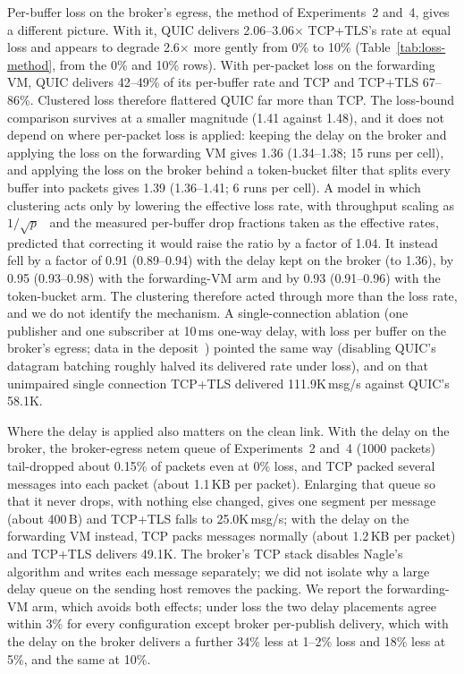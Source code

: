 \documentclass[a4paper,fleqn]{cas-dc}
\begin{document}
Per-buffer loss on the broker's egress, the method of Experiments~2 and~4, gives a different picture. With it, QUIC delivers 2.06--3.06$\times$ TCP+TLS's rate at equal loss and appears to degrade 2.6$\times$ more gently from 0\% to 10\% (Table~\ref{tab:loss-method}, from the 0\% and 10\% rows). With per-packet loss on the forwarding VM, QUIC delivers 42--49\% of its per-buffer rate and TCP and TCP+TLS 67--86\%. Clustered loss therefore flattered QUIC far more than TCP. The loss-bound comparison survives at a smaller magnitude (1.41 against 1.48), and it does not depend on where per-packet loss is applied: keeping the delay on the broker and applying the loss on the forwarding VM gives 1.36 (1.34--1.38; 15 runs per cell), and applying the loss on the broker behind a token-bucket filter that splits every buffer into packets gives 1.39 (1.36--1.41; 6 runs per cell). A model in which clustering acts only by lowering the effective loss rate, with throughput scaling as $1/\sqrt{p}$~\cite{mathis1997macroscopic} and the measured per-buffer drop fractions taken as the effective rates, predicted that correcting it would raise the ratio by a factor of 1.04. It instead fell by a factor of 0.91 (0.89--0.94) with the delay kept on the broker (to 1.36), by 0.95 (0.93--0.98) with the forwarding-VM arm and by 0.93 (0.91--0.96) with the token-bucket arm. The clustering therefore acted through more than the loss rate, and we do not identify the mechanism. A single-connection ablation (one publisher and one subscriber at 10\,ms one-way delay, with loss per buffer on the broker's egress; data in the deposit~\cite{bracht2026zenodo}) pointed the same way (disabling QUIC's datagram batching roughly halved its delivered rate under loss), and on that unimpaired single connection TCP+TLS delivered 111.9K\,msg/s against QUIC's 58.1K.

Where the delay is applied also matters on the clean link. With the delay on the broker, the broker-egress netem queue of Experiments~2 and~4 (1000 packets) tail-dropped about 0.15\% of packets even at 0\% loss, and TCP packed several messages into each packet (about 1.1\,KB per packet). Enlarging that queue so that it never drops, with nothing else changed, gives one segment per message (about 400\,B) and TCP+TLS falls to 25.0K\,msg/s; with the delay on the forwarding VM instead, TCP packs messages normally (about 1.2\,KB per packet) and TCP+TLS delivers 49.1K. The broker's TCP stack disables Nagle's algorithm and writes each message separately; we did not isolate why a large delay queue on the sending host removes the packing. We report the forwarding-VM arm, which avoids both effects; under loss the two delay placements agree within 3\% for every configuration except broker per-publish delivery, which with the delay on the broker delivers a further 34\% less at 1--2\% loss and 18\% less at 5\%, and the same at 10\%.
\end{document}
